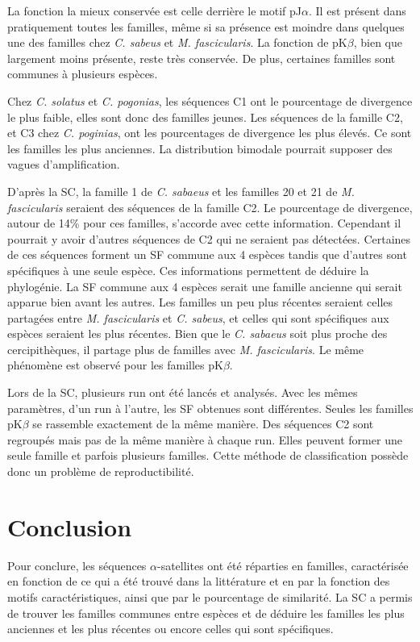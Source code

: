 \documentclass[12pt,a4paper]{article}
\begin{document}
	La fonction la mieux conservée est celle derrière le motif pJ$\alpha$. Il est présent dans pratiquement toutes les familles, même si sa présence est moindre dans quelques une des familles chez \textit{C. sabeus} et \textit{M. fascicularis}. La fonction de pK$\beta$, bien que largement moins présente, reste très conservée. De plus, certaines familles sont communes à plusieurs espèces.
	
	Chez \textit{C. solatus} et \textit{C. pogonias}, les séquences C1 ont le pourcentage de divergence le plus faible, elles sont donc des familles jeunes. Les séquences de la famille C2, et C3 chez \textit{C. poginias}, ont les pourcentages de divergence les plus élevés. Ce sont les familles les plus anciennes.  La distribution bimodale pourrait supposer des vagues d'amplification.
	
	D'après la SC, la famille 1 de \textit{C. sabaeus} et les familles 20 et 21 de \textit{M. fascicularis} seraient des séquences de la famille C2. Le pourcentage de divergence, autour de 14\% pour ces familles, s'accorde avec cette information. Cependant il pourrait y avoir d'autres séquences de C2 qui ne seraient pas détectées. Certaines de ces séquences forment un SF commune aux 4 espèces tandis que d'autres sont spécifiques à une seule espèce. Ces informations permettent de déduire la phylogénie. La SF commune aux 4 espèces serait une famille ancienne qui serait apparue bien avant les autres. Les familles un peu plus récentes seraient celles partagées entre \textit{M. fascicularis} et \textit{C. sabeus}, et celles qui sont spécifiques aux espèces seraient les plus récentes. Bien que le \textit{C. sabaeus} soit plus proche des cercipithèques, il partage plus de familles avec \textit{M. fascicularis}. Le même phénomène est observé pour les familles pK$\beta$.
	
	Lors de la SC, plusieurs run ont été lancés et analysés. Avec les mêmes paramètres, d'un run à l'autre, les SF obtenues sont différentes. Seules les familles pK$\beta$ se rassemble exactement de la même manière. Des séquences C2 sont regroupés mais pas de la même manière à chaque run. Elles peuvent former une seule famille et parfois plusieurs familles. Cette méthode de classification possède donc un problème de reproductibilité.  
	
\section{Conclusion}
	Pour conclure, les séquences  $\alpha$-satellites ont été réparties en familles, caractérisée en fonction de ce qui a été trouvé dans la littérature et en par la fonction des motifs caractéristiques, ainsi que par le pourcentage de similarité.  La SC a permis de trouver les familles communes entre espèces et de déduire les familles les plus anciennes et les plus récentes ou encore celles qui sont spécifiques.
	
\end{document}
